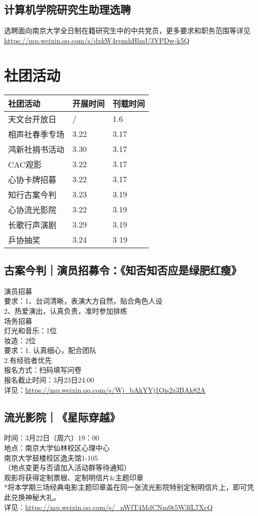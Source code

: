 \documentclass[letterpaper, 12pt]{article}
\begin{document}
\begin{multicols}{2}
\subsection{计算机学院研究生助理选聘}
选聘面向南京大学全日制在籍研究生中的中共党员，更多要求和职务范围等详见\url{https://mp.weixin.qq.com/s/dxkW4rpmhHhnU3YPDw-k5Q}
\section{社团活动}
\begin{tabular}{|>{\centering\arraybackslash}m{}|m{}|m{}|}
    \hline
    社团活动 & 开展时间 & 刊载时间\\
    \hline\hline
    天文台开放日 & / & 1.6\\
    相声社春季专场 & 3.22 & 3.17\\
    鸿新社捐书活动 & 3.30 & 3.17\\
    CAC观影 & 3.22 & 3.17\\
    心协卡牌招募 & 3.22 & 3.17\\
    知行古案今判 & 3.23 & 3.19\\
    心协流光影院 & 3.22 & 3.19\\
    长歌行声演剧 & 3.29 & 3.19\\
    乒协抽奖 & 3.24 & 3 19\\
    \hline
\end{tabular}
\subsection{古案今判｜演员招募令：《知否知否应是绿肥红瘦》}
演员招募
\\要求：1、台词清晰，表演大方自然，贴合角色人设
\\2、热爱演出，认真负责，准时参加排练
\\场务招募
\\灯光和音乐：1位
\\妆造：2位
\\要求：1. 认真细心，配合团队
\\2.有经验者优先
\\报名方式：扫码填写问卷
\\报名截止时间：3月23日24:00
\\详见：\url{https://mp.weixin.qq.com/s/Wj\_bAkYYj1Ois2z3BAk82A}

\subsection{流光影院｜《星际穿越》}
时间：3月22日（周六）19：00
\\地点：南京大学仙林校区心理中心
\\南京大学鼓楼校区逸夫馆1-105
\\（地点变更与否请加入活动群等待通知）
\\观影将获得定制票根、定制明信片\&主题印章
\\*将本学期三场经典电影主题印章盖在同一张流光影院特别定制明信片上，即可凭此兑换神秘大礼。
\\详见：\url{https://mp.weixin.qq.com/s/\_nWfT4MdCNm0t5W3fL7XcQ}


\end{multicols}
\end{document}
